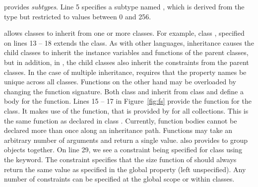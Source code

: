 \Klang{} provides {\em subtypes}. Line 5 specifies a subtype
named , which is derived from the  type but
restricted to values between 0 and 256.

\Klang{} allows classes to inherit from one or more classes. For
example, class , specified on lines 13 -- 18 extends the
 class. As with other languages, inheritance causes the
child classes to inherit the instance variables and functions of the
parent classes, but in addition, in \Klang{}, the child classes also
inherit the constraints from the parent classes. In the case of
multiple inheritance, \Klang{} requires that the property names be
unique across all classes. Functions on the other hand may be
overloaded by changing the function signature. Both class 
and  inherit from class  and define a body for
the  function. Lines 15 -- 17 in Figure~\ref{fig:fs}
provide the  function for the  class. It makes
use of the  function, that is provided by \Klang{} for all
collections. This is the same function as declared in class
. Currently, function bodies cannot be declared more than
once along an inheritance path. Functions may take an arbitrary number
of arguments and return a single value. \Klang{} also provides
 to group objects together. On line 29, we see a
constraint being specified for class  using the 
keyword. The constraint specifies that the size function of
 should always return the same value as specified in the
global property  (left unspecified). Any number
of constraints can be specified at the global scope or within classes. 

